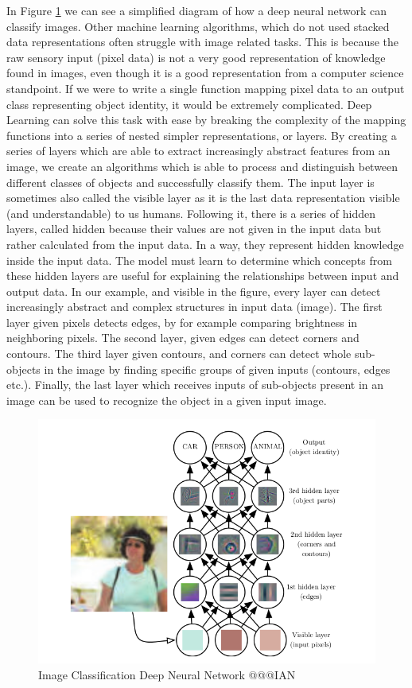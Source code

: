 \documentclass[b5paper]{book}
\begin{document}
In Figure \ref{fig:dnn_classify} we can see a simplified diagram of how a deep neural network can classify images. Other machine learning algorithms, which do not used stacked data representations often struggle with image related tasks. This is because the raw sensory input (pixel data) is not a very good representation of knowledge found in images, even though it is a good representation from a computer science standpoint. If we were to write a single function mapping pixel data to an output class representing object identity, it would be extremely complicated. Deep Learning can solve this task with ease by breaking the complexity of the mapping functions into a series of nested simpler representations, or layers. By creating a series of layers which are able to extract increasingly abstract features from an image, we create an algorithms which is able to process and distinguish between different classes of objects and successfully classify them. The input layer is sometimes also called the visible layer as it is the last data representation visible (and understandable) to us humans. Following it, there is a series of hidden layers, called hidden because their values are not given in the input data but rather calculated from the input data. In a way, they represent hidden knowledge inside the input data. The model must learn to determine which concepts from these hidden layers are useful for explaining the relationships between input and output data. In our example, and visible in the figure, every layer can detect increasingly abstract and complex structures in input data (image). The first layer given pixels detects edges, by for example comparing brightness in neighboring pixels. The second layer, given edges can detect corners and contours. The third layer given contours, and corners can detect whole sub-objects in the image by finding specific groups of given inputs (contours, edges etc.). Finally, the last layer which receives inputs of sub-objects present in an image can be used to recognize the object in a given input image.

\begin{figure}
    \centering
    \includegraphics[scale=0.5]{figures/image-classification.png}
    \caption{Image Classification Deep Neural Network @@@IAN}
    \label{fig:dnn_classify}
\end{figure}
\end{document}
